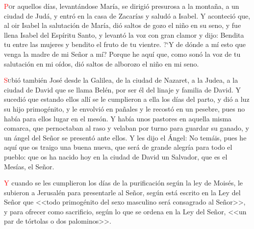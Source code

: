 \documentclass[10pt,twoside]{book}
\begin{document}
\vspace{0.5em}



\vspace{1.5em}

\noindent{}
\lettrine[lines=2]{\textcolor{red}{P}}or aquellos días, levantándose María, se dirigió presurosa a la montaña, a un ciudad de Judá, 
y entró en la casa de Zacarías y saludó a Isabel. Y aconteció que, al oir Isabel la salutación de María, dió saltos de 
gozo el niño en su seno, y fue llena Isabel del Espíritu Santo, y levantó la voz con gran clamor y dijo: Bendita tu entre 
las mujeres y bendito el fruto de tu vientre. {?`}Y de dónde a mí esto que venga la madre de mi Señor a mí? Porque he aquí que, 
como sonó la voz de tu salutación en mi oídos, dió saltos de alborozo el niño en mi seno.

\vspace{0.5em}



\vspace{1.5em}

\noindent{}
\lettrine[lines=2]{\textcolor{red}{S}}ubió también José desde la Galilea, de la ciudad de Nazaret, a la Judea, a la ciudad de David que se llama Belén, por ser él del linaje y familia de David.
Y sucedió que estando ellos allí se le cumplieron a ella los días del parto, y dió a luz su hijo primogénito, y le envolvió en pañales y le recostó en un pesebre, 
pues no había para ellos lugar en el mesón. Y había unos pastores en aquella misma comarca, que pernoctaban al raso y velaban por turno para guardar su ganado, 
y un ángel del Señor se presentó ante ellos. Y les dijo el Ángel: No temáis, pues he aquí que os traigo una buena nueva, que será de grande alegría para todo el pueblo: 
que os ha nacido hoy en la ciudad de David un Salvador, que es el Mesías, el Señor.

\vspace{0.5em}



\vspace{1.5em}

\noindent{}
\lettrine[lines=2]{\textcolor{red}{Y}}\space{} cuando se les cumplieron los días de la purificación según la ley de Moisés, le subieron a Jerusalén para presentarle al Señor,
según está escrito en la Ley del Señor que <<todo primogénito del sexo masculino será consagrado al Señor>>, y para ofrecer como sacrificio,
según lo que se ordena en la Ley del Señor, <<un par de tórtolas o dos palominos>>.
\end{document}
